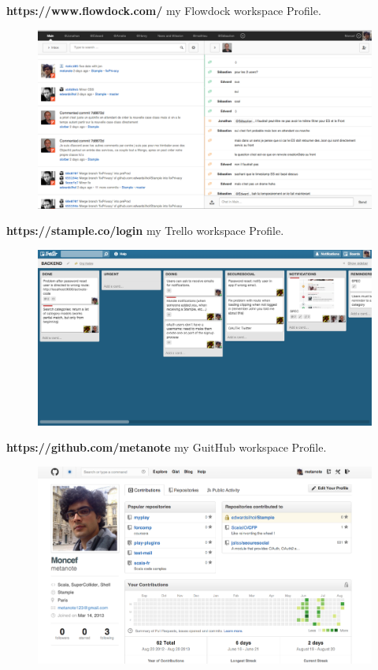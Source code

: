 \textbf{https://www.flowdock.com/} my Flowdock workspace Profile.
\begin{figure}[H]
        \centering
                \centering
                \includegraphics[width=\textwidth]{Flowdock.png}
               
\end{figure}
\newpage
\textbf{https://stample.co/login} my Trello workspace Profile.
\begin{figure}[H]
        \centering
                \centering
                \includegraphics[width=\textwidth]{trello.png}
               
\end{figure}
\textbf{https://github.com/metanote} my GuitHub workspace Profile.
\begin{figure}[H]
        \centering
                \centering
                \includegraphics[width=\textwidth]{gitProfile.png}
               
\end{figure}
